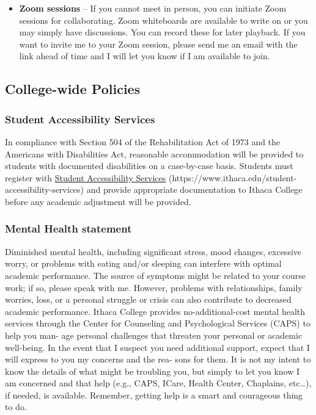 \documentclass[
  letterpaper,
  DIV=11,
  numbers=noendperiod]{scrartcl}
\providecommand{\tightlist}{%
  \setlength{\itemsep}{0pt}\setlength{\parskip}{0pt}}\usepackage{longtable,booktabs,array}
\begin{document}
\begin{itemize}
\tightlist
\item
  \textbf{Zoom sessions} -- If you cannot meet in person, you can
  initiate Zoom sessions for collaborating. Zoom whiteboards are
  available to write on or you may simply have discussions. You can
  record these for later playback. If you want to invite me to your Zoom
  session, please send me an email with the link ahead of time and I
  will let you know if I am available to join.
\end{itemize}

\subsection{College-wide Policies}\label{college-wide-policies}

\subsubsection{Student Accessibility
Services}\label{student-accessibility-services}

In compliance with Section 504 of the Rehabilitation Act of 1973 and the
Americans with Disabilities Act, reasonable accommodation will be
provided to students with documented disabilities on a case-by-case
basis. Students must register with
\hyperref[student-accessibility-services]{Student Accessibility
Services} (https://www.ithaca.edu/student-accessibility-services) and
provide appropriate documentation to Ithaca College before any academic
adjustment will be provided.

\subsubsection{Mental Health statement}\label{mental-health-statement}

Diminished mental health, including significant stress, mood changes,
excessive worry, or problems with eating and/or sleeping can interfere
with optimal academic performance. The source of symptoms might be
related to your course work; if so, please speak with me. However,
problems with relationships, family worries, loss, or a personal
struggle or crisis can also contribute to decreased academic
performance. Ithaca College provides no-additional-cost mental health
services through the Center for Counseling and Psychological Services
(CAPS) to help you man- age personal challenges that threaten your
personal or academic well-being. In the event that I suspect you need
additional support, expect that I will express to you my concerns and
the rea- sons for them. It is not my intent to know the details of what
might be troubling you, but simply to let you know I am concerned and
that help (e.g., CAPS, ICare, Health Center, Chaplains, etc\ldots), if
needed, is available. Remember, getting help is a smart and courageous
thing to do.
\end{document}
